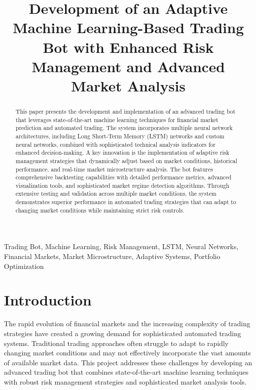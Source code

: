 \documentclass[conference]{IEEEtran}
\begin{document}
\title{Development of an Adaptive Machine Learning-Based Trading Bot with Enhanced Risk Management and Advanced Market Analysis}

\author{
}

\maketitle

\begin{abstract}
This paper presents the development and implementation of an advanced trading bot that leverages state-of-the-art machine learning techniques for financial market prediction and automated trading. The system incorporates multiple neural network architectures, including Long Short-Term Memory (LSTM) networks and custom neural networks, combined with sophisticated technical analysis indicators for enhanced decision-making. A key innovation is the implementation of adaptive risk management strategies that dynamically adjust based on market conditions, historical performance, and real-time market microstructure analysis. The bot features comprehensive backtesting capabilities with detailed performance metrics, advanced visualization tools, and sophisticated market regime detection algorithms. Through extensive testing and validation across multiple market conditions, the system demonstrates superior performance in automated trading strategies that can adapt to changing market conditions while maintaining strict risk controls.
\end{abstract}

\begin{IEEEkeywords}
Trading Bot, Machine Learning, Risk Management, LSTM, Neural Networks, Financial Markets, Market Microstructure, Adaptive Systems, Portfolio Optimization
\end{IEEEkeywords}

\section{Introduction}
The rapid evolution of financial markets and the increasing complexity of trading strategies have created a growing demand for sophisticated automated trading systems. Traditional trading approaches often struggle to adapt to rapidly changing market conditions and may not effectively incorporate the vast amounts of available market data. This project addresses these challenges by developing an advanced trading bot that combines state-of-the-art machine learning techniques with robust risk management strategies and sophisticated market analysis tools.
\end{document}
